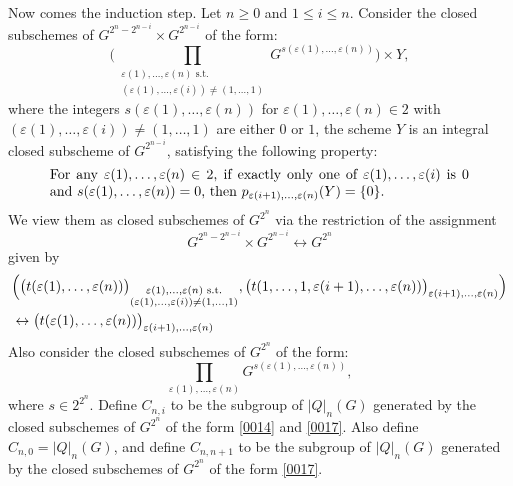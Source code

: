 \documentclass{amsart}
\theoremstyle{remark}
\numberwithin{equation}{subsection}
\begin{document}
Now comes the induction step.
Let $n \ge 0$ and $1 \le i \le n$.
Consider the closed subschemes of $G^{2^{n} - 2^{n - i}} \times G^{2^{n - i}}$ of the form:
	\begin{equation} \label{0014}
			\Biggl(
				\prod_{\substack{
					\varepsilon(1), \dots, \varepsilon(n) \text{ s.t.} \\
					(\varepsilon(1), \dots, \varepsilon(i)) \ne (1, \dots, 1)
				}}
					G^{s(\varepsilon(1), \dots, \varepsilon(n))}
			\Biggr)
		\times
			Y,
	\end{equation}
where the integers $s(\varepsilon(1), \dots, \varepsilon(n))$ for $\varepsilon(1), \dots, \varepsilon(n) \in 2$
with $(\varepsilon(1), \dots, \varepsilon(i)) \ne (1, \dots, 1)$ are either $0$ or $1$,
the scheme $Y$ is an integral closed subscheme of $G^{2^{n - i}}$,
satisfying the following property:
	\begin{equation} \label{0480}
		\begin{minipage}[c]{300pt}
			For any $\varepsilon(1), \dots, \varepsilon(n) \in 2$,
			if exactly only one of $\varepsilon(1), \dots, \varepsilon(i)$ is $0$
			and $s(\varepsilon(1), \dots, \varepsilon(n)) = 0$,
			then $p_{\varepsilon(i + 1), \dots, \varepsilon(n)}(Y) = \{0\}$.
		\end{minipage}
	\end{equation}
We view them as closed subschemes of $G^{2^{n}}$ via the restriction of the assignment
	\[
			G^{2^{n} - 2^{n - i}} \times G^{2^{n - i}}
		\leftrightarrow
			G^{2^{n}}
	\]
given by
	\begin{align*}
		&		\Bigl(
					\bigl(
						t(\varepsilon(1), \dots, \varepsilon(n))
					\bigr)_{\substack{
						\varepsilon(1), \dots, \varepsilon(n) \text{ s.t.} \\
						(\varepsilon(1), \dots, \varepsilon(i)) \ne (1, \dots, 1)
					}},
					\bigl(
						t(1, \dots, 1, \varepsilon(i + 1), \dots, \varepsilon(n))
					\bigr)_{\varepsilon(i + 1), \dots, \varepsilon(n)}
				\Bigr)
		\\
		&	\leftrightarrow
				\bigl(
					t(\varepsilon(1), \dots, \varepsilon(n))
				\bigr)_{\varepsilon(i + 1), \dots, \varepsilon(n)}
	\end{align*}
Also consider the closed subschemes of $G^{2^{n}}$ of the form:
	\begin{equation} \label{0017}
		\prod_{\varepsilon(1), \dots, \varepsilon(n)}
			G^{s(\varepsilon(1), \dots, \varepsilon(n))},
	\end{equation}
where $s \in 2^{2^{n}}$.
Define $C_{n, i}$ to be the subgroup of $|Q|_{n}(G)$ generated by
the closed subschemes of $G^{2^{n}}$ of the form
\eqref{0014} and
\eqref{0017}.
Also define $C_{n, 0} = |Q|_{n}(G)$,
and define $C_{n, n + 1}$ to be the subgroup of $|Q|_{n}(G)$ generated by
the closed subschemes of $G^{2^{n}}$ of the form
\eqref{0017}.
\end{document}
